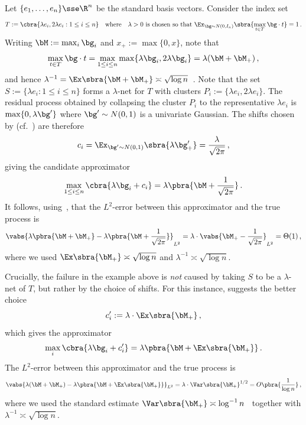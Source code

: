 \documentclass[11pt]{article}
\begin{document}
\begin{example} \label{eg:intro-example}
	Let $\{e_1, \dots, e_n\} \sse \R^n$ be the standard basis vectors. Consider the index set 
	\[
		T := \cbra{\lambda e_i, 2\lambda e_i : 1 \leq i \leq n} 
		\quad\text{where}\quad 
		\lambda > 0~\text{is chosen so that}~\Ex_{\bg\sim N(0,I_n)}\sbra{\max_{t\in T} \bg\cdot t} = 1\,.
	\]
	Writing $\bM := \max_i \bg_i$ and $x_+ := \max\{0, x\}$, note that 
	\begin{equation} \label{eq:intro-eg-true-process}
		\max_{t\in T} \bg\cdot t = \max_{1\leq i\leq n} \max \{\lambda \bg_i, 2\lambda \bg_i\} = \lambda(\bM + \bM_+)\,,
	\end{equation}
	and hence $\lambda^{-1} = \Ex\sbra{\bM + \bM_{+}} \asymp \sqrt{\log n}$~\cite[Appendix~A.2]{chatterjee2014superconcentration}. 
	Note that the set $S := \{\lambda e_i : 1 \leq i \leq n\}$ forms a $\lambda$-net for $T$ with clusters $P_i := \{\lambda e_i, 2\lambda e_i\}$. 
	The residual process obtained by collapsing the cluster $P_i$ to the representative $\lambda e_i$ is $\max\{0, \lambda \bg'\}$ where $\bg' \sim N(0, 1)$ is a univariate Gaussian. 
	The shifts chosen by  \cite{de2026sparsifying} (cf.~) are therefore 
	\[
		c_i 
		= \Ex_{\bg' \sim N(0, 1)}\sbra{\lambda\bg'_+} 
		= \frac{\lambda}{\sqrt{2\pi}}\,,
	\]
	giving the candidate approximator  
	\[
		\max_{1 \leq i \leq n} \cbra{\lambda\bg_i + c_i} = \lambda\pbra{\bM + \frac{1}{\sqrt{2\pi}}}\,.
	\]
	It follows, using~, that the $L^2$-error between this approximator and the true process is 
	\[
		\vabs{
			\lambda\pbra{\bM + \bM_+} - 	\lambda\pbra{\bM + \frac{1}{\sqrt{2\pi}}}
		}_{L^2}
		= 
		\lambda\cdot
		\vabs{
			\bM_+ - \frac{1}{\sqrt{2\pi}} 
		}_{L^2}
		=
		\Theta(1)\,,
	\]
	where we used $\Ex\sbra{\bM_+} \asymp \sqrt{\log n}$ and
	$\lambda^{-1}\asymp \sqrt{\log n}$. 
\end{example}

Crucially, the failure in the example above is \emph{not} caused by taking $S$ to be a $\lambda$-net of $T$, but rather by the choice of shifts. 
For this instance,  suggests the better choice
\[
	 c_i' := \lambda\cdot\Ex\sbra{\bM_+}\,,
\]
which gives the approximator
\[
	\max_i\cbra{\lambda \bg_i+c_i'}
	=
	\lambda\pbra{\bM+\Ex\sbra{\bM_+}}\,.
\]
The $L^2$-error between this approximator and the true process is
\[
	\vabs{\lambda(\bM+\bM_+) - \lambda\pbra{\bM+\Ex\sbra{\bM_+}}}_{L^2}
	=
	\lambda\cdot\Var\sbra{\bM_+}^{1/2}
	=
	O\pbra{\frac{1}{\log n}}\,,
\]
where we used the standard estimate $\Var\sbra{\bM_+}\asymp \log^{-1} n$~\cite[Appendix~A.2]{chatterjee2014superconcentration} together with $\lambda^{-1}\asymp\sqrt{\log n}$.
\end{document}
